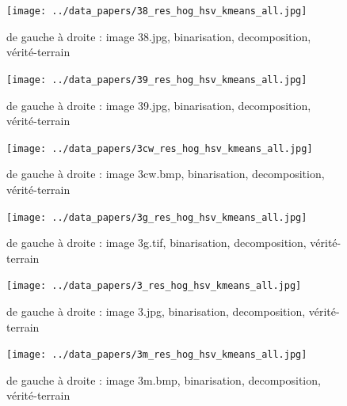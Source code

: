 \documentclass{book}
\begin{document}
\begin{figure}[H]
\begin{center}
\texttt{[image: ../data\_papers/38\_res\_hog\_hsv\_kmeans\_all.jpg]}
\end{center}
\caption{de gauche à droite : image 38.jpg, binarisation, decomposition, vérité-terrain}
\label{38}
\end{figure}
\clearpage


\begin{figure}[H]
\begin{center}
\texttt{[image: ../data\_papers/39\_res\_hog\_hsv\_kmeans\_all.jpg]}
\end{center}
\caption{de gauche à droite : image 39.jpg, binarisation, decomposition, vérité-terrain}
\label{39}
\end{figure}
\clearpage


\begin{figure}[H]
\begin{center}
\texttt{[image: ../data\_papers/3cw\_res\_hog\_hsv\_kmeans\_all.jpg]}
\end{center}
\caption{de gauche à droite : image 3cw.bmp, binarisation, decomposition, vérité-terrain}
\label{3cw}
\end{figure}
\clearpage


\begin{figure}[H]
\begin{center}
\texttt{[image: ../data\_papers/3g\_res\_hog\_hsv\_kmeans\_all.jpg]}
\end{center}
\caption{de gauche à droite : image 3g.tif, binarisation, decomposition, vérité-terrain}
\label{3g}
\end{figure}
\clearpage


\begin{figure}[H]
\begin{center}
\texttt{[image: ../data\_papers/3\_res\_hog\_hsv\_kmeans\_all.jpg]}
\end{center}
\caption{de gauche à droite : image 3.jpg, binarisation, decomposition, vérité-terrain}
\label{3}
\end{figure}
\clearpage


\begin{figure}[H]
\begin{center}
\texttt{[image: ../data\_papers/3m\_res\_hog\_hsv\_kmeans\_all.jpg]}
\end{center}
\caption{de gauche à droite : image 3m.bmp, binarisation, decomposition, vérité-terrain}
\label{3m}
\end{figure}
\clearpage
\end{document}
